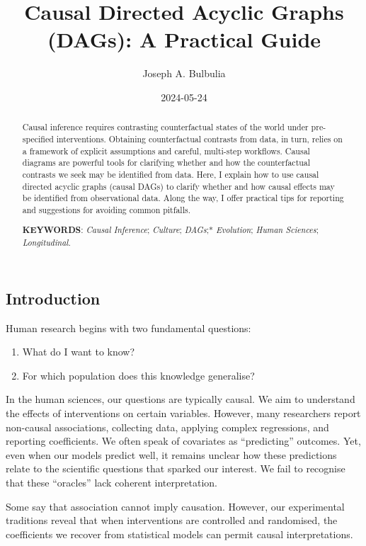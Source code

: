 \documentclass[
  single column]{article}
\title{Causal Directed Acyclic Graphs (DAGs): A Practical Guide}
\author{Joseph A. Bulbulia}
\affil{%
             \small{     Victoria University of Wellington, New Zealand
          ORCID \textcolor[HTML]{A6CE39}{\aiOrcid} ~0000-0002-5861-2056 }
              }
\date{2024-05-24}
\providecommand{\tightlist}{%
  \setlength{\itemsep}{0pt}\setlength{\parskip}{0pt}}\usepackage{longtable,booktabs,array}
\begin{document}
\maketitle
\begin{abstract}
Causal inference requires contrasting counterfactual states of the world
under pre-specified interventions. Obtaining counterfactual contrasts
from data, in turn, relies on a framework of explicit assumptions and
careful, multi-step workflows. Causal diagrams are powerful tools for
clarifying whether and how the counterfactual contrasts we seek may be
identified from data. Here, I explain how to use causal directed acyclic
graphs (causal DAGs) to clarify whether and how causal effects may be
identified from observational data. Along the way, I offer practical
tips for reporting and suggestions for avoiding common pitfalls.

\textbf{KEYWORDS}: \emph{Causal Inference}; \emph{Culture};
\emph{DAGs};* \emph{Evolution}; \emph{Human Sciences};
\emph{Longitudinal}.
\end{abstract}

\subsection{Introduction}\label{introduction}

Human research begins with two fundamental questions:

\begin{enumerate}
\def\labelenumi{\arabic{enumi}.}
\tightlist
\item
  What do I want to know?
\item
  For which population does this knowledge generalise?
\end{enumerate}

In the human sciences, our questions are typically causal. We aim to
understand the effects of interventions on certain variables. However,
many researchers report non-causal associations, collecting data,
applying complex regressions, and reporting coefficients. We often speak
of covariates as ``predicting'' outcomes. Yet, even when our models
predict well, it remains unclear how these predictions relate to the
scientific questions that sparked our interest. We fail to recognise
that these ``oracles'' lack coherent interpretation.

Some say that association cannot imply causation. However, our
experimental traditions reveal that when interventions are controlled
and randomised, the coefficients we recover from statistical models can
permit causal interpretations.
\end{document}
